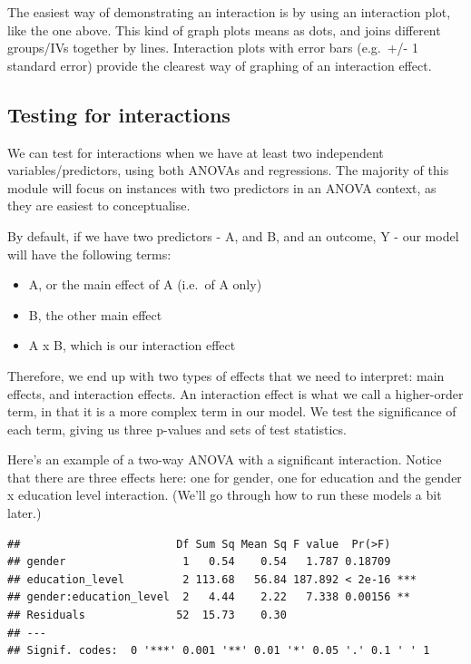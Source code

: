 \documentclass[
]{book}
\providecommand{\tightlist}{%
  \setlength{\itemsep}{0pt}\setlength{\parskip}{0pt}}
\begin{document}
The easiest way of demonstrating an interaction is by using an interaction plot, like the one above. This kind of graph plots means as dots, and joins different groups/IVs together by lines. Interaction plots with error bars (e.g.~+/- 1 standard error) provide the clearest way of graphing of an interaction effect.

\subsection{Testing for interactions}\label{testing-for-interactions}

We can test for interactions when we have at least two independent variables/predictors, using both ANOVAs and regressions. The majority of this module will focus on instances with two predictors in an ANOVA context, as they are easiest to conceptualise.

By default, if we have two predictors - A, and B, and an outcome, Y - our model will have the following terms:

\begin{itemize}
\tightlist
\item
  A, or the main effect of A (i.e.~of A only)
\item
  B, the other main effect
\item
  A x B, which is our interaction effect
\end{itemize}

Therefore, we end up with two types of effects that we need to interpret: main effects, and interaction effects. An interaction effect is what we call a higher-order term, in that it is a more complex term in our model. We test the significance of each term, giving us three p-values and sets of test statistics.

Here's an example of a two-way ANOVA with a significant interaction. Notice that there are three effects here: one for gender, one for education and the gender x education level interaction. (We'll go through how to run these models a bit later.)

\begin{verbatim}
##                        Df Sum Sq Mean Sq F value  Pr(>F)    
## gender                  1   0.54    0.54   1.787 0.18709    
## education_level         2 113.68   56.84 187.892 < 2e-16 ***
## gender:education_level  2   4.44    2.22   7.338 0.00156 ** 
## Residuals              52  15.73    0.30                    
## ---
## Signif. codes:  0 '***' 0.001 '**' 0.01 '*' 0.05 '.' 0.1 ' ' 1
\end{verbatim}
\end{document}
